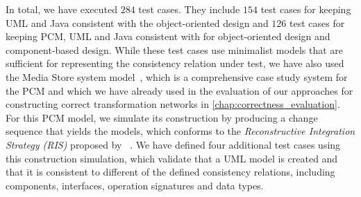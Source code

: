 In total, we have executed $284$ test cases.
They include $154$ test cases for keeping \gls{UML} and Java consistent with the object-oriented design \commonalities and $126$ test cases for keeping \gls{PCM}, \gls{UML} and Java consistent with \commonalities for object-oriented design and component-based design.
While these test cases use minimalist models that are sufficient for representing the consistency relation under test, we have also used the Media Store system model~\cite{strittmatter2016a}, which is a comprehensive case study system for the \gls{PCM} and which we have already used in the evaluation of our approaches for constructing correct transformation networks in \autoref{chap:correctness_evaluation}.
For this \gls{PCM} model, we simulate its construction by producing a change sequence that yields the models, which conforms to the \emph{Reconstructive Integration Strategy (RIS)} proposed by \citeauthor{langhammer2017a}~\cite{langhammer2017a,klare2020Vitruv-JSS}.
We have defined four additional test cases using this construction simulation, which validate that a \gls{UML} model is created and that it is consistent to different of the defined consistency relations, including components, interfaces, operation signatures and data types.





